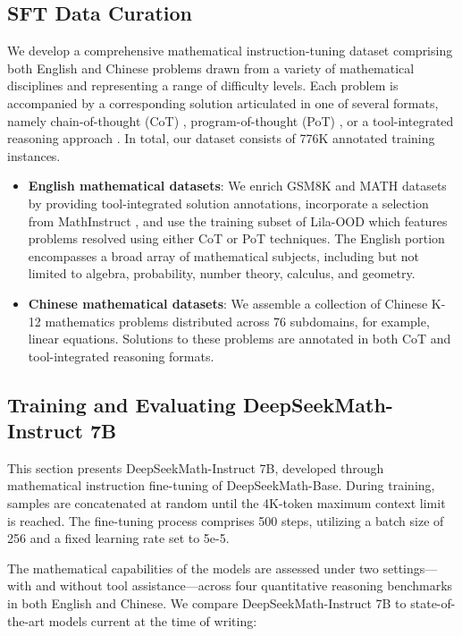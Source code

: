 \begin{itemize}[topsep=0pt]
\subsection{SFT Data Curation}

We develop a comprehensive mathematical instruction-tuning dataset comprising both English and Chinese problems drawn from a variety of mathematical disciplines and representing a range of difficulty levels. Each problem is accompanied by a corresponding solution articulated in one of several formats, namely chain-of-thought (CoT) \citep{cot}, program-of-thought (PoT) \citep{pot,pal}, or a tool-integrated reasoning approach \citep{tora}. In total, our dataset consists of 776K annotated training instances.

\begin{itemize}[topsep=0pt]
    \item \textbf{English mathematical datasets}: We enrich GSM8K and MATH datasets by providing tool-integrated solution annotations, incorporate a selection from MathInstruct \citep{MathInstruct}, and use the training subset of Lila-OOD \citep{lila} which features problems resolved using either CoT or PoT techniques. The English portion encompasses a broad array of mathematical subjects, including but not limited to algebra, probability, number theory, calculus, and geometry.
    \item \textbf{Chinese mathematical datasets}: We assemble a collection of Chinese K-12 mathematics problems distributed across 76 subdomains, for example, linear equations. Solutions to these problems are annotated in both CoT and tool-integrated reasoning formats.
\end{itemize}

\subsection{Training and Evaluating DeepSeekMath-Instruct 7B}

This section presents DeepSeekMath-Instruct 7B, developed through mathematical instruction fine-tuning of DeepSeekMath-Base. During training, samples are concatenated at random until the 4K-token maximum context limit is reached. The fine-tuning process comprises 500 steps, utilizing a batch size of 256 and a fixed learning rate set to 5e-5.

The mathematical capabilities of the models are assessed under two settings—with and without tool assistance—across four quantitative reasoning benchmarks in both English and Chinese. We compare DeepSeekMath-Instruct 7B to state-of-the-art models current at the time of writing:


\end{itemize}
